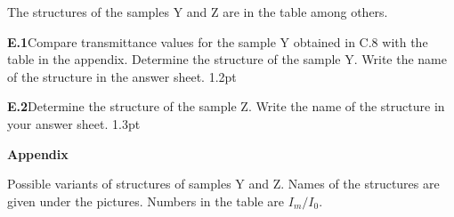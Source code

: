 The structures of the samples Y and Z are in the table among others.

\textbf{E.1}\quad Compare transmittance values for the sample Y obtained in C.8
with the table in the appendix. Determine the structure of the sample Y. Write
the name of the structure in the answer sheet. \hfill 1.2pt

\textbf{E.2}\quad Determine the structure of the sample Z. Write the name of
the structure in your answer sheet. \hfill 1.3pt

\textbf{Appendix}

Possible variants of structures of samples Y and Z. Names of the structures are
given under the pictures. Numbers in the table are $I_m/I_0$.

